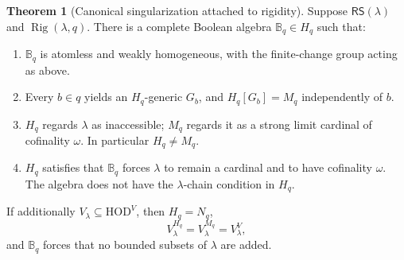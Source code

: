 \documentclass[11pt,letterpaper]{article}
\theoremstyle{definition}
\newtheorem{theorem}[definition]{Theorem}
\numberwithin{equation}{section}
\newcommand{\HOD}{\mathrm{HOD}}
\newcommand{\Rig}{\operatorname{Rig}}
\newcommand{\RS}{\mathsf{RS}}
\newcommand{\BB}{\mathbb B}
\begin{document}
\begin{theorem}[Canonical singularization attached to rigidity]\label{thm:forcing-main}
Suppose $\RS(\lambda)$ and $\Rig(\lambda,q)$. There is a complete Boolean
algebra $\BB_q\in H_q$ such that:
\begin{enumerate}
\item $\BB_q$ is atomless and weakly homogeneous, with the finite-change
group acting as above.
\item Every $b\in q$ yields an $H_q$-generic $G_b$, and
$H_q[G_b]=M_q$ independently of $b$.
\item $H_q$ regards $\lambda$ as inaccessible; $M_q$ regards it as a
strong limit cardinal of cofinality $\omega$. In particular $H_q\ne M_q$.
\item $H_q$ satisfies that $\BB_q$ forces $\lambda$ to remain a cardinal
and to have cofinality $\omega$. The algebra does not have the
$\lambda$-chain condition in $H_q$.
\end{enumerate}
If additionally $V_\lambda\subseteq\HOD^V$, then $H_q=N_q$,
\[
 V_\lambda^{H_q}=V_\lambda^{M_q}=V_\lambda^V,
\]
and $\BB_q$ forces that no bounded subsets of $\lambda$ are added.
\end{theorem}
\end{document}
